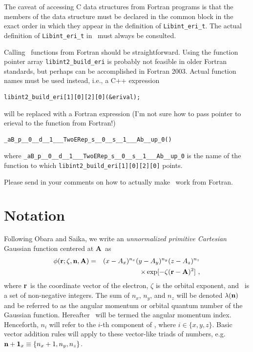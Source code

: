 \documentclass[10pt]{article}
\begin{document}
The caveat of accessing C data structures from Fortran programs is that the members of the data structure must be
declared in the common block in the exact order in which they appear in the definition of {\tt Libint\_eri\_t}.
The actual definition of {\tt Libint\_eri\_t} in \libinttypesh\ must always be consulted.

Calling \LIBINT\ functions from Fortran should be straightforward. Using the function pointer array {\tt libint2\_build\_eri} is probably
not feasible in older Fortran standards, but perhaps can be accomplished in Fortran 2003. Actual function names must be used instead, i.e.,
a C++ expression
\begin{verbatim}
libint2_build_eri[1][0][2][0](&erival);
\end{verbatim}
will be replaced with a Fortran expression (I'm not sure how to pass pointer to erieval to the function from Fortran!)
\begin{verbatim}
_aB_p__0__d__1___TwoERep_s__0__s__1___Ab__up_0()
\end{verbatim}
where {\tt \_aB\_p\_\_0\_\_d\_\_1\_\_\_TwoERep\_s\_\_0\_\_s\_\_1\_\_\_Ab\_\_up\_0} is the name of the function
to which {\tt libint2\_build\_eri[1][0][2][0]} points.

Please send in your comments on how to actually make \LIBINT\ work from Fortran.


\appendix
\appendixpage
\section{\label{sec:notation} Notation}

Following Obara and Saika,\cite{Obara86}
we write an {\em unnormalized primitive Cartesian} Gaussian function centered at {\bf A}\ as
\begin{eqnarray}
\phi ({\bf r}; \zeta, {\bf n}, {\bf A}) & = & (x - A_x)^{n_x} (y - A_y)^{n_y} (z - A_z)^{n_z} \nonumber \\
& & \times \exp [-\zeta({\bf r}-{\bf A})^2]\ ,
\end{eqnarray}
where {\bf r}\ is the coordinate vector of the electron, $\zeta$ is the orbital exponent, and
\n\ is a set of non-negative integers. The sum of $n_x$, $n_y$, and $n_z$ will be denoted $\lambda({\bf n})$
and be referred to as the angular momentum or orbital quantum number of the Gaussian function.
Hereafter \n\ will be termed the angular momentum index.
Henceforth, $n_i$ will refer to the $i$-th component of \n, where $i \in \{x, y, z\}$.
Basic vector addition rules will apply to these vector-like triads of numbers, e.g.
${\bf n} + {\bf 1}_x \equiv \{ n_x+1, n_y, n_z\}$.
\end{document}
